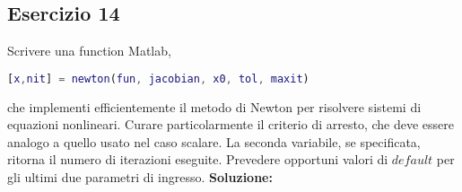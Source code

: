 \subsection{Esercizio 14}
Scrivere una function Matlab,
\begin{lstlisting}[language=Matlab]
[x,nit] = newton(fun, jacobian, x0, tol, maxit)
\end{lstlisting}
che implementi efficientemente il metodo di Newton per risolvere sistemi di equazioni nonlineari.
Curare particolarmente il criterio di arresto, che deve essere analogo a quello usato nel caso scalare.
La seconda variabile, se specificata, ritorna il numero di iterazioni eseguite. Prevedere opportuni
valori di $default$ per gli ultimi due parametri di ingresso.
\newline \textbf{Soluzione:}

